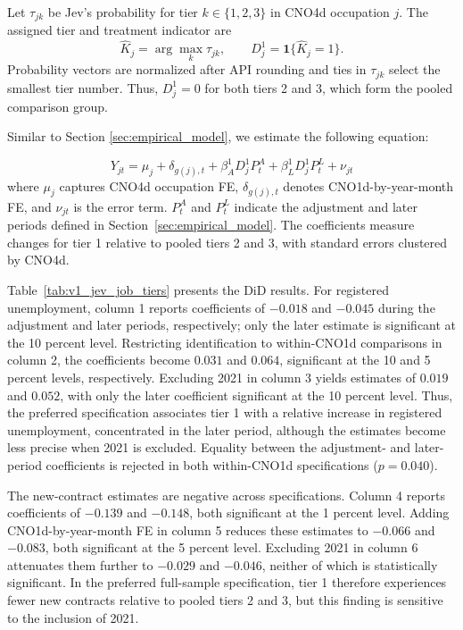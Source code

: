 Let $\tau_{jk}$ be Jev's probability for tier $k\in\{1,2,3\}$ in CNO4d occupation $j$. The assigned tier and treatment indicator are
\begin{equation}
\label{eq:v1_jev_tier_assignment}
\widehat K_j=\arg\max_k\tau_{jk},\qquad D_j^1=\mathbf{1}\{\widehat K_j=1\}.
\end{equation}
Probability vectors are normalized after API rounding and ties in $\tau_{jk}$ select the smallest tier number. Thus, $D_j^1=0$ for both tiers 2 and 3, which form the pooled comparison group.

Similar to Section \ref{sec:empirical_model}, we estimate the following equation:

\begin{equation}
Y_{jt}=\mu_j+\delta_{g(j),t}+\beta^1_A D^1_jP^A_t+\beta^1_L D^1_jP^L_t+\nu_{jt}
\label{eq:tier_static}
\end{equation}
where $\mu_j$ captures CNO4d occupation FE, $\delta_{g(j),t}$ denotes CNO1d-by-year-month FE, and $\nu_{jt}$ is the error term. $P^A_t$ and $P^L_t$ indicate the adjustment and later periods defined in Section~\ref{sec:empirical_model}. The coefficients measure changes for tier 1 relative to pooled tiers 2 and 3, with standard errors clustered by CNO4d.

Table~\ref{tab:v1_jev_job_tiers} presents the DiD results. For registered unemployment, column 1 reports coefficients of \(-0.018\) and \(-0.045\) during the adjustment and later periods, respectively; only the later estimate is significant at the 10 percent level. Restricting identification to within-CNO1d comparisons in column 2, the coefficients become \(0.031\) and \(0.064\), significant at the 10 and 5 percent levels, respectively. Excluding 2021 in column 3 yields estimates of \(0.019\) and \(0.052\), with only the later coefficient significant at the 10 percent level. Thus, the preferred specification associates tier 1 with a relative increase in registered unemployment, concentrated in the later period, although the estimates become less precise when 2021 is excluded. Equality between the adjustment- and later-period coefficients is rejected in both within-CNO1d specifications (\(p=0.040\)).

The new-contract estimates are negative across specifications. Column 4 reports coefficients of \(-0.139\) and \(-0.148\), both significant at the 1 percent level. Adding CNO1d-by-year-month FE in column 5 reduces these estimates to \(-0.066\) and \(-0.083\), both significant at the 5 percent level. Excluding 2021 in column 6 attenuates them further to \(-0.029\) and \(-0.046\), neither of which is statistically significant. In the preferred full-sample specification, tier 1 therefore experiences fewer new contracts relative to pooled tiers 2 and 3, but this finding is sensitive to the inclusion of 2021.


